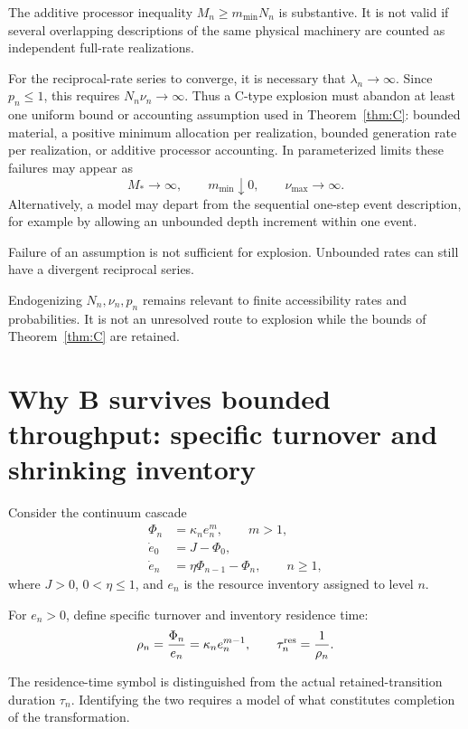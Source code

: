 \documentclass[11pt,a4paper]{article}
\theoremstyle{definition}
\numberwithin{equation}{section}
\begin{document}
The additive processor inequality
$M_n\ge m_{\min}N_n$ is substantive. It is not valid if several
overlapping descriptions of the same physical machinery are counted
as independent full-rate realizations.

For the reciprocal-rate series to converge, it is necessary that
$\lambda_n\to\infty$. Since $p_n\le1$, this requires
$N_n\nu_n\to\infty$. Thus a C-type explosion must abandon at least
one uniform bound or accounting assumption used in
Theorem~\ref{thm:C}: bounded material, a positive minimum allocation
per realization, bounded generation rate per realization, or additive
processor accounting. In parameterized limits these failures may
appear as
\[
M_*\to\infty,\qquad
m_{\min}\downarrow0,\qquad
\nu_{\max}\to\infty.
\]
Alternatively, a model may depart from the sequential one-step event
description, for example by allowing an unbounded depth increment
within one event.

Failure of an assumption is not sufficient for explosion. Unbounded
rates can still have a divergent reciprocal series.

Endogenizing $N_n,\nu_n,p_n$ remains relevant to finite accessibility
rates and probabilities. It is not an unresolved route to explosion
while the bounds of Theorem~\ref{thm:C} are retained.


\section{Why B survives bounded throughput:
specific turnover and shrinking inventory}

Consider the continuum cascade
\begin{align}
\Phi_n&=\kappa_ne_n^m,\qquad m>1, \label{eq:flux}\\
\dot e_0&=J-\Phi_0,\\
\dot e_n&=\eta\Phi_{n-1}-\Phi_n,\qquad n\ge1,
\label{eq:cascade}
\end{align}
where $J>0$, $0<\eta\le1$, and $e_n$ is the resource inventory
assigned to level $n$.

For $e_n>0$, define specific turnover and inventory residence time:
\begin{equation}
\rho_n=\frac{\Phi_n}{e_n}
=\kappa_ne_n^{m-1},
\qquad
\tau_n^{\rm res}=\frac1{\rho_n}.
\label{eq:rho}
\end{equation}

The residence-time symbol is distinguished from the actual
retained-transition duration $\tau_n$. Identifying the two requires
a model of what constitutes completion of the transformation.
\end{document}
